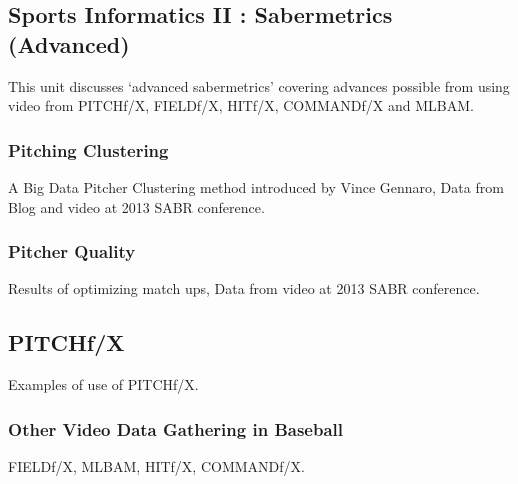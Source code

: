 \subsection{Sports Informatics II : Sabermetrics
(Advanced)}\label{sports-informatics-ii-sabermetrics-advanced}

This unit discusses `advanced sabermetrics' covering advances possible
from using video from PITCHf/X, FIELDf/X, HITf/X, COMMANDf/X and MLBAM.




\subsubsection{Pitching Clustering}\label{pitching-clustering}

A Big Data Pitcher Clustering method introduced by Vince Gennaro, Data
from Blog and video at 2013 SABR conference.




\subsubsection{Pitcher Quality}\label{pitcher-quality}

Results of optimizing match ups, Data from video at 2013 SABR
conference.





\subsection{PITCHf/X}\label{pitchfx}

Examples of use of PITCHf/X.




\subsubsection{Other Video Data Gathering in
Baseball}\label{other-video-data-gathering-in-baseball}

FIELDf/X, MLBAM, HITf/X, COMMANDf/X.




